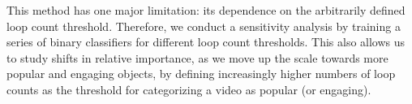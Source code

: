 This method has one major limitation: its dependence on the arbitrarily defined loop count threshold. Therefore, we conduct a  sensitivity analysis by training a series of binary classifiers for different loop count thresholds. This also allows us to study shifts in relative importance, as we move up the scale towards more popular and engaging objects, by defining increasingly higher numbers of loop counts as the threshold for categorizing a video as popular (or engaging). 
%
%
